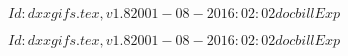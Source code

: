 \documentclass{article}
\begin{document}
$Id: dxxgifs.tex,v 1.8 2001-08-20 16:02:02 docbill Exp $


\pagebreak


$Id: dxxgifs.tex,v 1.8 2001-08-20 16:02:02 docbill Exp $


\pagebreak
\end{document}
